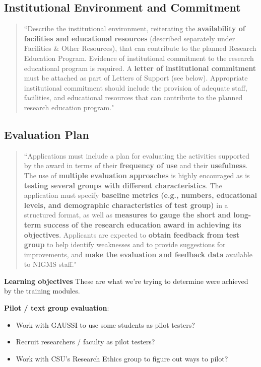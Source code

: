 \documentclass[pdftex,english,11pt,parskip=half]{scrartcl}
\begin{document}
\subsection{Institutional Environment and Commitment}

\begin{quotation}
``Describe the institutional environment, reiterating the \textbf{availability of facilities and educational resources} (described separately under Facilities \& Other Resources), that can contribute to the planned Research Education Program. Evidence of institutional commitment to the research educational program is required. A \textbf{letter of institutional commitment} must be attached as part of Letters of Support (see below). Appropriate institutional commitment should include the provision of adequate staff, facilities, and educational resources that can contribute to the planned research education program."
\end{quotation}

\subsection{Evaluation Plan}

\begin{quotation}
``Applications must include a plan for evaluating the activities supported by the award in terms of their \textbf{frequency of use} and their \textbf{usefulness}. The use of \textbf{multiple evaluation approaches} is highly encouraged as is \textbf{testing several groups with different characteristics}. The application must specify \textbf{baseline metrics (e.g., numbers, educational levels, and demographic characteristics of test group)} in a structured format, as well as \textbf{measures to gauge the short and long-term success of the research education award in achieving its objectives}. Applicants are expected to \textbf{obtain feedback from test group} to help identify weaknesses and to provide suggestions for improvements, and \textbf{make the evaluation and feedback data} available to NIGMS staff."
\end{quotation}



\textbf{Learning objectives} These are what we're trying to determine were achieved by the training modules.

\textbf{Pilot / text group evaluation}:

\begin{itemize}
\item Work with GAUSSI to use some students as pilot testers?
\item Recruit researchers / faculty as pilot testers?
\item Work with CSU's Research Ethics group to figure out ways to pilot?
\end{itemize}
\end{document}
